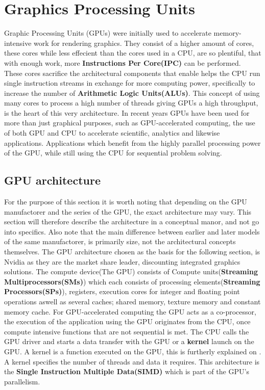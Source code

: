 \section{Graphics Processing Units}
Graphic Processing Units (GPUs) were initially used to accelerate memory-intensive work for rendering graphics.
They consist of a higher amount of cores, these cores while less effecient than the cores used in a CPU, are so plentiful, that with enough work, more \textbf{Instructions Per Core(IPC)} can be performed.
These cores sacrifice the architectural components that enable helps the CPU run single instruction streams in exchange for more computing power, specifically to increase the number of \textbf{Arithmetic Logic Units(ALUs)}. %
This concept of using many cores to process a high number of threads giving GPUs a high throughput, is the heart of this very architecture.
In recent years GPUs have been used for more than just graphical purposes, such as GPU-accelerated computing, the use of both GPU and CPU to accelerate scientific, analytics and likewise applications.
Applications which benefit from the highly parallel processing power of the GPU, while still using the CPU for sequential problem solving.

\subsection{GPU architecture}
For the purpose of this section it is worth noting that depending on the GPU manufactorer and the series of the GPU, the exact architecture may vary.
This section will therefore describe the architecture in a conceptual manor, and not go into specifics. 
Also note that the main difference between earlier and later models of the same manufactorer, is primarily size, not the architectural concepts themselves.
The GPU architecture chosen as the basis for the following section, is Nvidia as they are the market share leader, discounting integrated graphics solutions. 
The compute device(The GPU) consists of Compute units(\textbf{Streaming Multiprocessors(SMs)}) which each consists of processing elements(\textbf{Streaming Processors(SPs)}), registers, execution cores for integer and floating point operations aswell as several caches; shared memory, texture memory and constant memory cache.
For GPU-accelerated computing the GPU acts as a co-processor, the execution of the application using the GPU originates from the CPU, once compute intensive functions that are not sequential is met.
The CPU calls the GPU driver and starts a data transfer with the GPU or a \textbf{kernel} launch on the GPU.
A kernel is a function executed on the GPU, this is furtherly explained on .
A kernel specifies the number of threads and data it requires.
This architecture is the \textbf{Single Instruction Multiple Data(SIMD)} which is part of the GPU's parallelism.
